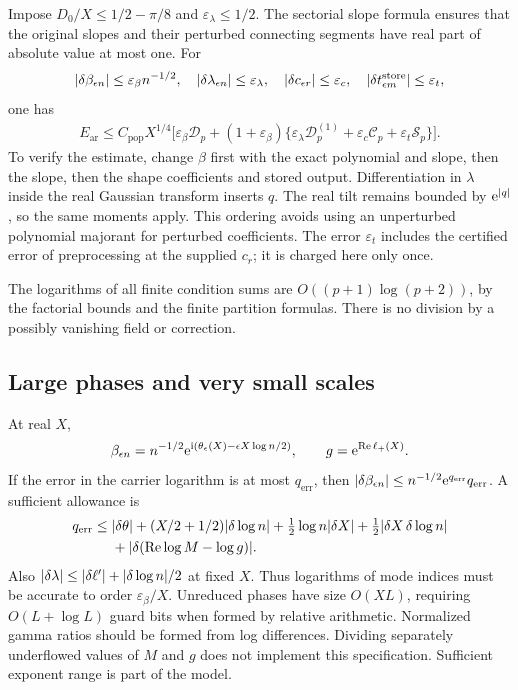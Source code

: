 Impose
\(D_0/X\le1/2-\pi/8\) and \(\varepsilon_\lambda\le1/2\).
The sectorial slope formula ensures that the original slopes
and their perturbed connecting segments have real part of
absolute value at most one.
For
\[
 \lvert \delta\beta_{\epsilon n}\rvert\le\varepsilon_\beta n^{-1/2},
 \quad\lvert \delta\lambda_{\epsilon n}\rvert\le\varepsilon_\lambda,
 \quad\lvert \delta c_{\epsilon r}\rvert\le\varepsilon_c,\quad
 \lvert \delta t_{\epsilon m}^{\mathrm{store}}\rvert\le\varepsilon_t,
\]
one has
\begin{equation}
\begin{split}
 E_{\mathrm{ar}}\le C_{\mathrm{pop}}X^{1/4}
 \bigl[\varepsilon_\beta\mathcal D_p
 +(1+\varepsilon_\beta)
 \{\varepsilon_\lambda\mathcal D_p^{(1)}
               +\varepsilon_c\mathcal C_p+\varepsilon_t\mathcal S_p\}\bigr].
\end{split}
\label{eq:arithmetic-error}
\end{equation}
To verify the estimate, change \(\beta\) first with the exact
polynomial and slope, then the slope, then the shape coefficients
and stored output. Differentiation in \(\lambda\) inside the
real Gaussian transform inserts \(q\).
The real tilt remains bounded by \(\mathrm e^{\lvert q\rvert}\), so the same
moments apply. This ordering avoids using an unperturbed
polynomial majorant for perturbed coefficients.
The error \(\varepsilon_t\) includes the certified error of
preprocessing at the supplied \(c_r\); it is charged here
only once.

The logarithms of all finite condition sums are
\(O((p+1)\log(p+2))\), by the factorial bounds and the finite
partition formulas. There is no division by a possibly vanishing
field or correction.

\subsection{Large phases and very small scales}
At real \(X\),
\[
 \beta_{\epsilon n}=n^{-1/2}
    \mathrm e^{\mathrm i(\theta_\epsilon(X)-\epsilon X\log n/2)},\qquad
 g=\mathrm e^{\operatorname{Re}\ell_+(X)}.
\]
If the error in the carrier logarithm is at most \(q_{\mathrm{err}}\),
then
\(\lvert \delta\beta_{\epsilon n}\rvert
\le n^{-1/2}\mathrm e^{q_{\mathrm{err}}}q_{\mathrm{err}}\).
A sufficient allowance is
\begin{align}
 q_{\mathrm{err}}\le{}&
 \lvert \delta\theta\rvert
 +(X/2+1/2)\lvert \delta\log n\rvert
 +\tfrac12\log n\lvert \delta X\rvert
 +\tfrac12\lvert \delta X\,\delta\log n\rvert\nonumber\\
 &+\lvert \delta(\operatorname{Re}\log M-\log g)\rvert.
 \label{eq:phase-budget}
\end{align}
Also
\(\lvert \delta\lambda\rvert\le\lvert \delta\ell'\rvert+
\lvert \delta\log n\rvert/2\) at fixed \(X\).
Thus logarithms of mode indices must be accurate to order
\(\varepsilon_\beta/X\).
Unreduced phases have size \(O(XL)\), requiring
\(O(L+\log L)\) guard bits when formed by relative arithmetic.
Normalized gamma ratios should be formed from log differences.
Dividing separately underflowed values of \(M\) and \(g\)
does not implement this specification.
Sufficient exponent range is part of the model.

